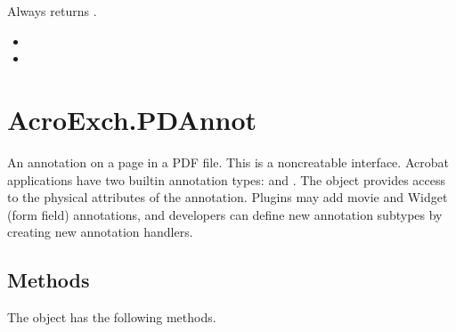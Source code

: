 \documentclass[letterpaper,12pt,english,openany,oneside]{sphinxmanual}
\begin{document}
Always returns .

\label{\detokenize{IAC_API_OLE_Objects:related-methods-65}}
\begin{itemize}
\item {} 
 

\item {} 
 

\end{itemize}




\section{AcroExch.PDAnnot}
\label{\detokenize{IAC_API_OLE_Objects:acroexch-pdannot}}
An annotation on a page in a PDF file. This is a non\sphinxhyphen{}creatable interface. Acrobat applications have two built\sphinxhyphen{}in annotation types:  and . The object provides access to the physical attributes of the annotation. Plugins may add movie and Widget (form field) annotations, and developers can define new annotation subtypes by creating new annotation handlers.


\subsection{Methods}
\label{\detokenize{IAC_API_OLE_Objects:methods-3}}\label{\detokenize{IAC_API_OLE_Objects:id7}}
The  object has the following methods.
\end{document}
